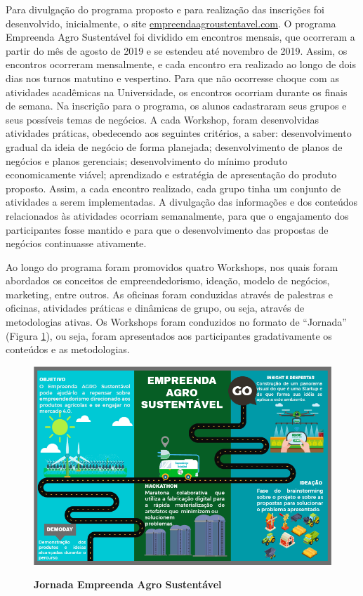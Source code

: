 Para divulgação do programa proposto e para realização das inscrições foi desenvolvido, inicialmente, o site \href{http://www.empreendaagrosustentavel.com}{empreendaagroustentavel.com}.
O programa Empreenda Agro Sustentável foi dividido em encontros mensais, que ocorreram a partir do mês de agosto de 2019 e se estendeu até novembro de 2019. Assim, os encontros ocorreram mensalmente, e cada encontro era realizado ao longo de dois dias nos turnos matutino e vespertino. Para que não ocorresse choque com as atividades acadêmicas na Universidade, os encontros ocorriam durante os finais de semana. Na inscrição para o programa, os alunos cadastraram seus grupos e seus possíveis temas de negócios. 
A cada Workshop, foram desenvolvidas atividades práticas, obedecendo aos seguintes critérios, a saber: desenvolvimento gradual da ideia de negócio de forma planejada; desenvolvimento de planos de negócios e planos gerenciais; desenvolvimento do mínimo produto economicamente viável; aprendizado e estratégia de apresentação do produto proposto.
Assim, a cada encontro realizado, cada grupo tinha um conjunto de atividades a serem implementadas. A divulgação das informações e dos conteúdos relacionados às atividades ocorriam semanalmente, para que o engajamento dos participantes fosse mantido e para que o desenvolvimento das propostas de negócios continuasse ativamente. 

Ao longo do programa foram promovidos quatro Workshops, nos quais foram abordados os conceitos de empreendedorismo, ideação, modelo de negócios, marketing, entre outros. As oficinas foram conduzidas através de palestras e oficinas, atividades práticas e dinâmicas de grupo, ou seja, através de metodologias ativas. Os Workshops foram conduzidos no formato de “Jornada” (Figura \ref{figura_17}), ou seja, foram apresentados aos participantes gradativamente os conteúdos e as metodologias.

\begin{figure}[H]
\centering
\caption{\textbf{Jornada Empreenda Agro Sustentável}}
\includegraphics[scale=0.5]{Imagens/jornada.png}
\label{figura_17}
\end{figure}

